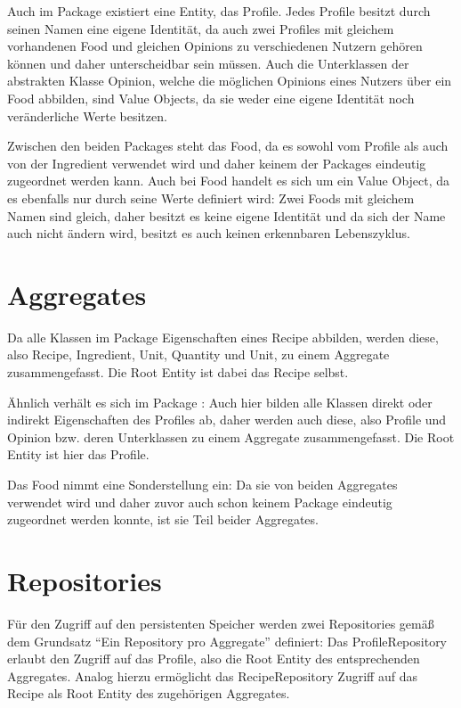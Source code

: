Auch im Package \href{https://github.com/anditru/quickie/tree/bb41442c7f1ffbfcd3117cd86a40f7932e543a33/3-quickie-domain/src/main/java/org/pinkcrazyunicorn/quickie/domain/recipe}{} existiert eine Entity, das Profile. Jedes Profile besitzt durch seinen Namen eine eigene Identität, da auch zwei Profiles mit gleichem vorhandenen Food und gleichen Opinions zu verschiedenen Nutzern gehören können und daher unterscheidbar sein müssen. Auch die Unterklassen der abstrakten Klasse Opinion, welche die möglichen Opinions eines Nutzers über ein Food abbilden, sind Value Objects, da sie weder eine eigene Identität noch veränderliche Werte besitzen.

Zwischen den beiden Packages steht das Food, da es sowohl vom Profile als auch von der Ingredient verwendet wird und daher keinem der Packages eindeutig zugeordnet werden kann. Auch bei Food handelt es sich um ein Value Object, da es ebenfalls nur durch seine Werte definiert wird: Zwei Foods mit gleichem Namen sind gleich, daher besitzt es keine eigene Identität und da sich der Name auch nicht ändern wird, besitzt es auch keinen erkennbaren Lebenszyklus. 

\section{Aggregates}
Da alle Klassen im Package \href{https://github.com/anditru/quickie/tree/bb41442c7f1ffbfcd3117cd86a40f7932e543a33/3-quickie-domain/src/main/java/org/pinkcrazyunicorn/quickie/domain/recipe}{} Eigenschaften eines Recipe abbilden, werden diese, also Recipe, Ingredient, Unit, Quantity und Unit, zu einem Aggregate zusammengefasst. Die Root Entity ist dabei das Recipe selbst.

Ähnlich verhält es sich im Package \href{https://github.com/anditru/quickie/tree/bb41442c7f1ffbfcd3117cd86a40f7932e543a33/3-quickie-domain/src/main/java/org/pinkcrazyunicorn/quickie/domain/profile}{}: Auch hier bilden alle Klassen direkt oder indirekt Eigenschaften des Profiles ab, daher werden auch diese, also Profile und Opinion bzw. deren Unterklassen zu einem Aggregate zusammengefasst. Die Root Entity ist hier das Profile.

Das Food nimmt eine Sonderstellung ein: Da sie von beiden Aggregates verwendet wird und daher zuvor auch schon keinem Package eindeutig zugeordnet werden konnte, ist sie Teil beider Aggregates.

\section{Repositories}
Für den Zugriff auf den persistenten Speicher werden zwei Repositories gemäß dem Grundsatz \enquote{Ein Repository pro Aggregate} definiert: Das ProfileRepository erlaubt den Zugriff auf das Profile, also die Root Entity des entsprechenden Aggregates. Analog hierzu ermöglicht das RecipeRepository Zugriff auf das Recipe als Root Entity des zugehörigen Aggregates. 

